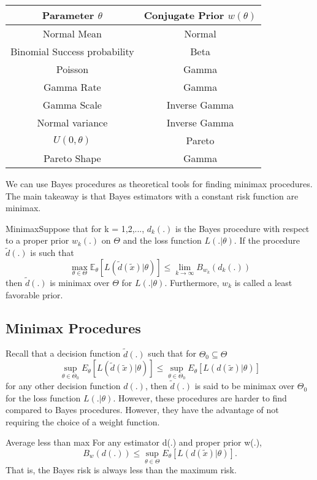 \documentclass[twoside]{article}
\begin{document}
\begin{center}
\begin{tabular}{ |c|c| } 
\hline
Parameter $\theta$ & Conjugate Prior $w(\theta)$ \\
 \hline
 Normal Mean & Normal \\ 
 Binomial Success probability & Beta \\ 
 Poisson & Gamma \\ 
 Gamma Rate & Gamma \\
 Gamma Scale & Inverse Gamma \\
 Normal variance & Inverse Gamma \\
 $U(0,\theta)$ & Pareto \\
 Pareto Shape & Gamma\\
 \hline
\end{tabular}
\end{center}


We can use Bayes procedures as theoretical tools for finding minimax procedures. The main takeaway is that Bayes estimators with a constant risk function are minimax. 

\begin{theorem_exam}{Minimax}{}Suppose that for k = 1,2,..., $d_k(.)$ is the Bayes procedure with respect to a proper prior $w_k(.)$ on $\Theta$ and the loss function $L(.|\theta).$ If the procedure $\tilde{d}(.)$ is such that 
$$
\max_{\theta \in \Theta}\mathbb{E}_{\theta}[L(\tilde{d}(\tilde{x})|\theta)] \leq 
\lim_{k \rightarrow \infty}B_{w_{k}}(d_k(.))
$$
then $\tilde{d}(.)$ is minimax over $\Theta$ for $L(.|\theta).$ Furthermore, $w_k$ is called a least favorable prior.
\end{theorem_exam}

\subsection{Minimax Procedures}
Recall that a decision function $\tilde{d}(.)$ such that for $\Theta_0 \subseteq \Theta$
$$
\sup_{\theta \in \Theta_0}E_{\theta}[L(\tilde{d}(\tilde{x})|\theta)] \leq \sup_{\theta \in \Theta_0}E_{\theta}[L(d(\tilde{x})|\theta)]
$$
for any other decision function $d(.)$, then $\tilde{d}(.)$ is said to be minimax over $\Theta_0$ for the loss function $L(.|\theta).$ However, these procedures are harder to find compared to Bayes procedures. However, they have the advantage of not requiring the choice of a weight function.\\

\begin{proposition_exam}{Average less than max}{} For any estimator d(.) and proper prior w(.), 
$$
B_w(d(.)) \leq \sup_{\theta \in \Theta}E_{\theta}[L(d(\tilde{x})|\theta)].
$$
That is, the Bayes risk is always less than the maximum risk.
\end{proposition_exam}
\end{document}
